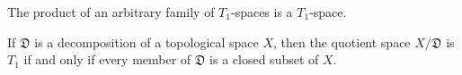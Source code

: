 The product of an arbitrary family of $T_1$-spaces is a $T_1$-space.

If $\mathfrak{D}$ is a decomposition of a topological space $X$, then the quotient space $X / \mathfrak{D}$ is $T_1$ if and only if every member of $\mathfrak{D}$ is a closed subset of $X$.
